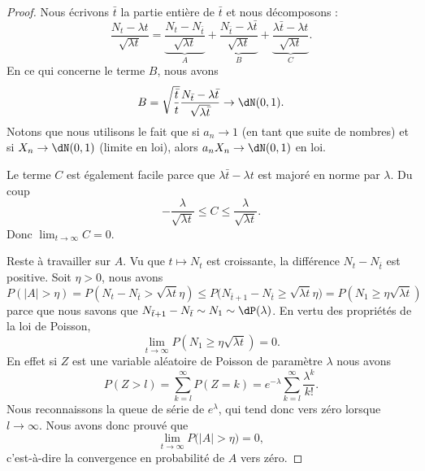 \begin{proof}
	Nous écrivons \( \bar t\) la partie entière de \( \bar t\) et nous décomposons :
	\begin{equation}
		\frac{ N_t-\lambda t }{ \sqrt{\lambda t} }=\underbrace{\frac{ N_t-N_{\bar t} }{ \sqrt{\lambda t} }}_A+\underbrace{\frac{ N_{\bar t}-\lambda \bar t }{ \sqrt{\lambda t} }}_B+\underbrace{\frac{ \lambda \bar t-\lambda t }{ \sqrt{\lambda t} }}_C.
	\end{equation}
	En ce qui concerne le terme \( B\), nous avons
	\begin{equation}
		B=\sqrt{\frac{ \bar t }{ t }}\frac{ N_{\bar t}-\lambda \bar t }{ \sqrt{\lambda \bar t} }\to\dN(0,1).
	\end{equation}
	Notons que nous utilisons le fait que si \( a_n\to 1\) (en tant que suite de nombres) et si \( X_n\to\dN(0,1)\) (limite en loi), alors \( a_nX_n\to \dN(0,1)\) en loi.

	Le terme \( C\) est également facile parce que \( \lambda \bar t-\lambda t\) est majoré en norme par \( \lambda\). Du coup
	\begin{equation}
		-\frac{ \lambda }{ \sqrt{\lambda t} }\leq C\leq \frac{ \lambda }{ \sqrt{\lambda t} }.
	\end{equation}
	Donc \( \lim_{t\to \infty} C=0\).

	Reste à travailler sur \( A\). Vu que \( t\mapsto N_t\) est croissante, la différence \( N_t-N_{\bar t}\) est positive. Soit \( \eta>0\), nous avons
	\begin{equation}
		P(| A |>\eta)=P(N_t-N_{\bar t}>\sqrt{\lambda t}\eta)\leq P\big( N_{\bar t+1}-N_{\bar t}\geq \sqrt{\lambda t}\eta \big)=P(N_1\geq \eta\sqrt{\lambda t})
	\end{equation}
	parce que nous savons que \( N_{\bar t+1}-N_{\bar t}\sim N_1\sim\dP(\lambda)\). En vertu des propriétés de la loi de Poisson,
	\begin{equation}
		\lim_{t\to \infty}P(N_1\geq \eta\sqrt{\lambda t})=0.
	\end{equation}
	En effet si \( Z\) est une variable aléatoire de Poisson de paramètre \( \lambda\) nous avons
	\begin{equation}
		P(Z>l)=\sum_{k=l}^{\infty}P(Z=k)= e^{-\lambda}\sum_{k=l}^{\infty}\frac{ \lambda^k }{ k! }.
	\end{equation}
	Nous reconnaissons la queue de série de \(  e^{\lambda}\), qui tend donc vers zéro lorsque \( l\to \infty\). Nous avons donc prouvé que
	\begin{equation}
		\lim_{t\to \infty} P\big( | A |>\eta \big)=0,
	\end{equation}
	c'est-à-dire la convergence en probabilité de \( A\) vers zéro.


\end{proof}
